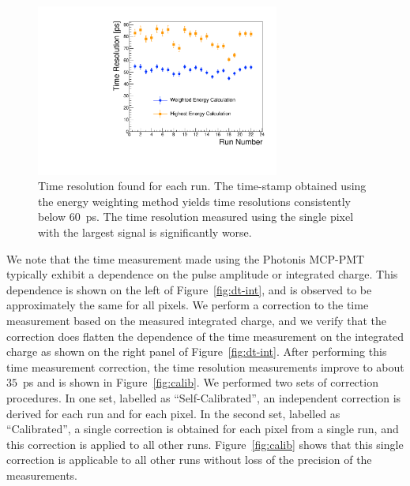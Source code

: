 \begin{figure}[htbp] 
\centering
\includegraphics[width=8cm]{Images/wtres/tresperrun.pdf} 
\caption{\small Time resolution found for each run. The time-stamp obtained using the energy weighting method yields time resolutions consistently below $60$~ps. The time resolution measured using the single pixel with the largest signal is significantly worse.} 
\label{fig:wtres} 
\end{figure} 

We note that the time measurement made using the Photonis MCP-PMT typically exhibit
a dependence on the pulse amplitude or integrated charge. This dependence is
shown on the left of Figure~\ref{fig:dt-int}, and is observed to be
approximately the same for all pixels. We perform a correction to the time
measurement based on the measured integrated charge, and we verify that the
correction does flatten the dependence of the time measurement on the integrated
charge as shown on the right panel of Figure~\ref{fig:dt-int}. After performing
this time measurement correction, the time resolution measurements improve to
about $35$~ps and is shown in Figure~\ref{fig:calib}. We performed two sets of
correction procedures. In one set, labelled as ``Self-Calibrated'', an
independent correction is derived for each run and for each pixel. In the second
set, labelled as ``Calibrated'', a single correction is obtained for each pixel
from a single run, and this correction is applied to all other runs.
Figure~\ref{fig:calib} shows that this single correction is applicable to all
other runs without loss of the precision of the measurements. 

